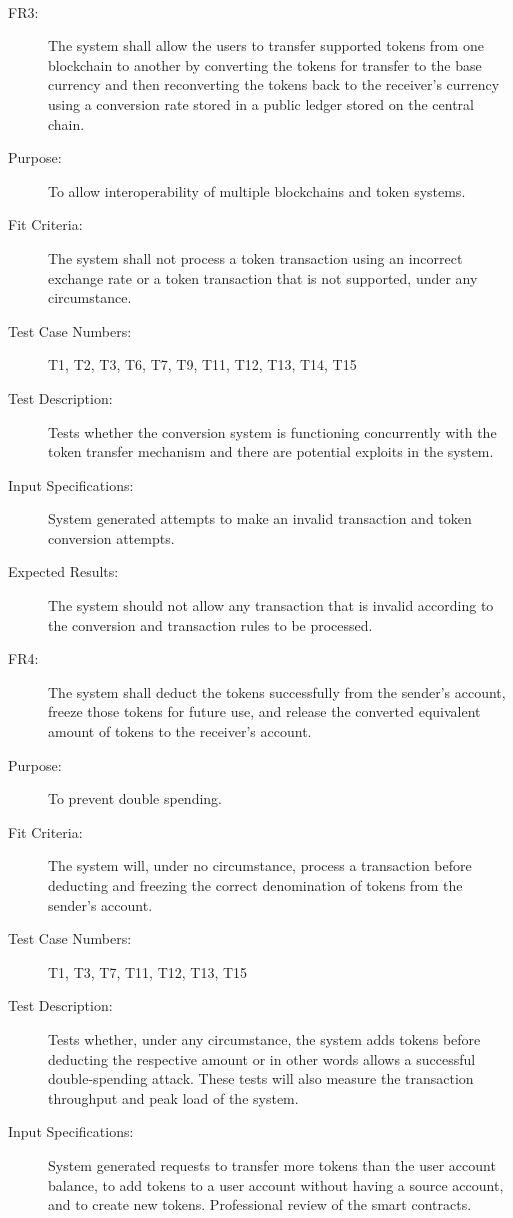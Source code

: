 \documentclass[a4paper,twoside,phd]{BYUPhys}
\begin{document}
\begin{description}
\\
\item[FR3:] The system shall allow the users to transfer supported tokens from one blockchain to another by converting the tokens for transfer to the base currency and then reconverting the tokens back to the receiver’s currency using a conversion rate stored in a public ledger stored on the central chain.
\item[Purpose:] To allow interoperability of multiple blockchains and token systems.
\item[Fit Criteria:] The system shall not process a token transaction using an incorrect exchange rate or a token transaction that is not supported, under any circumstance.
\item[Test Case Numbers:] T1, T2, T3, T6, T7, T9, T11, T12, T13, T14, T15
\item[Test Description:] Tests whether the conversion system is functioning concurrently with the token transfer mechanism and there are potential exploits in the system.
\item[Input Specifications:] System generated attempts to make an invalid transaction and token conversion attempts.
\item[Expected Results:] The system should not allow any transaction that is invalid according to the conversion and transaction rules to be processed.
\\
\item[FR4:] The system shall deduct the tokens successfully from the sender’s account, freeze those tokens for future use, and release the converted equivalent amount of tokens to the receiver’s account.
\item[Purpose:] To prevent double spending.
\item[Fit Criteria:] The system will, under no circumstance, process a transaction before deducting and freezing the correct denomination of tokens from the sender's account.
\item[Test Case Numbers:] T1, T3, T7, T11, T12, T13, T15
\item[Test Description:] Tests whether, under any circumstance, the system adds tokens before deducting the respective amount or in other words allows a successful double-spending attack. These tests will also measure the transaction throughput and peak load of the system.
\item[Input Specifications:] System generated requests to transfer more tokens than the user account balance, to add tokens to a user account without having a source account, and to create new tokens. Professional review of the smart contracts.

\end{description}
\end{document}
